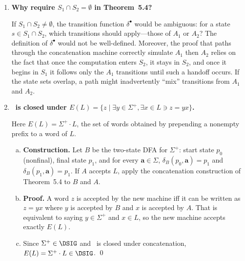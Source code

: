 \begin{enumerate}[{5.}1. ]
\begin{enumerate}[(a)]
  \item \textbf{\NSIG\ is not closed under Kleene closure.}  For
  \[
    L=\{\pmb{a},\pmb{b}\}^*-\{\pmb{a}^n\pmb{b}^n\mid n\ge 1\},
  \]
  we have $\lambda\in L$ and $L\cdot L=\Sigma^*$, so
  $L^*=\Sigma^*\in\DSIG$.

  \item \textbf{If $L\in\NSIG$, then $L^+\in\NSIG$: No.}  For
  \[
    L=\{\pmb{a},\pmb{b}\}^*-\{\pmb{a}^n\pmb{b}^n\mid n\ge 1\},
  \]
  because $\lambda\in L$ we have $L^+=L^*=\Sigma^*$, which is FAD.
\end{enumerate}

\item \textbf{Why require $S_1\cap S_2=\emptyset$ in Theorem~5.4?}

If $S_1\cap S_2\neq\emptyset$, the transition function $\delta^\bullet$ would be ambiguous: for a state $s\in S_1\cap S_2$, which transitions should apply---those of $A_1$ or $A_2$?  The definition of $\delta^\bullet$ would not be well-defined.  Moreover, the proof that paths through the concatenation machine correctly simulate $A_1$ then $A_2$ relies on the fact that once the computation enters $S_2$, it stays in $S_2$, and once it begins in $S_1$ it follows only the $A_1$ transitions until such a handoff occurs.  If the state sets overlap, a path might inadvertently ``mix'' transitions from $A_1$ and $A_2$.

\item \textbf{\DSIG\ is closed under $E(L)=\{z\mid\exists y\in\Sigma^+,\exists x\in L\ni z=yx\}$.}

Here $E(L)=\Sigma^+\cdot L$, the set of words obtained by prepending a nonempty
prefix to a word of $L$.

\begin{enumerate}[(a)]
  \item \textbf{Construction.}  Let $B$ be the two-state DFA for $\Sigma^+$:
  start state $p_0$ (nonfinal), final state $p_1$, and for every
  $\pmb{a}\in\Sigma$,
  $\delta_B(p_0,\pmb{a})=p_1$ and $\delta_B(p_1,\pmb{a})=p_1$.  If $A$ accepts
  $L$, apply the concatenation construction of Theorem~5.4 to $B$ and $A$.

  \item \textbf{Proof.}  A word $z$ is accepted by the new machine iff it can be
  written as $z=yx$ where $y$ is accepted by $B$ and $x$ is accepted by $A$.
  That is equivalent to saying $y\in\Sigma^+$ and $x\in L$, so the new machine
  accepts exactly $E(L)$.

  \item Since $\Sigma^+\in\DSIG$ and \DSIG\ is closed under concatenation,
  $E(L)=\Sigma^+\cdot L\in\DSIG$. \qed
\end{enumerate}


\end{enumerate}
